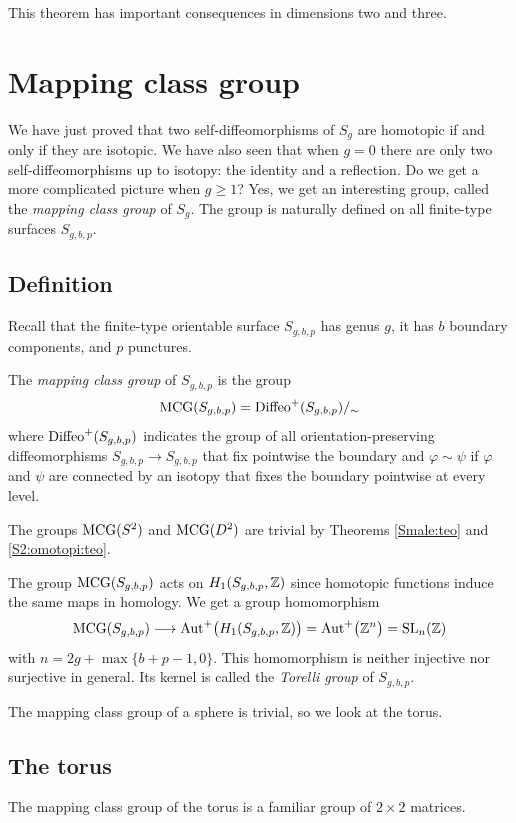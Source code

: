 This theorem has important consequences in dimensions two and three.

\section{Mapping class group} \label{MCG:section}
We have just proved that two self-diffeomorphisms of $S_g$ are homotopic if and only if they are isotopic. We have also seen that when $g=0$ there are only two self-diffeomorphisms up to isotopy: the identity and a reflection. Do we get a more complicated picture when $g\geqslant 1$? Yes, we get an interesting group, called the \emph{mapping class group} of $S_g$. The group is naturally defined on all finite-type surfaces $S_{g,b,p}$.

\subsection{Definition}
Recall that the finite-type orientable surface $S_{g,b,p}$ has genus $g$, it has $b$ boundary components, and $p$ punctures. 
\begin{defn}
The \emph{mapping class group} of $S_{g,b,p}$ is the group
$${\rm MCG}(S_{g,b,p}) = {\rm Diffeo}^+(S_{g,b,p})/_\sim$$
where ${\rm Diffeo}^+(S_{g,b,p})$ indicates the group of all orientation-preserving diffeomorphisms $S_{g,b,p}\to S_{g,b,p}$ that fix pointwise the boundary and $\varphi\sim\psi$ if $\varphi$ and $\psi$ are connected by an isotopy that fixes the boundary pointwise at every level.
\end{defn}

\begin{example}
The groups ${\rm MCG}(S^2)$ and ${\rm MCG}(D^2)$ are trivial by Theorems \ref{Smale:teo} and \ref{S2:omotopi:teo}.
\end{example}

The group ${\rm MCG}(S_{g,b,p})$ acts on $H_1(S_{g,b,p}, \mathbb{Z})$ since homotopic functions induce the same maps in homology. We get a group homomorphism 
$${\rm MCG}(S_{g,b,p}) \longrightarrow {\rm Aut}^+\big(H_1(S_{g,b,p}, \mathbb{Z})\big) = {\rm Aut}^+ \big(\mathbb{Z}^{n}\big) = {\rm SL}_{n}(\mathbb{Z})$$
with $n=2g+ \max\{b+p-1,0\}$. This homomorphism is neither injective nor surjective in general. Its kernel is called the \emph{Torelli group} of $S_{g,b,p}$. 

The mapping class group of a sphere is trivial, so we look at the torus.

\subsection{The torus}
The mapping class group of the torus is a familiar group of $2\times 2$ matrices.

